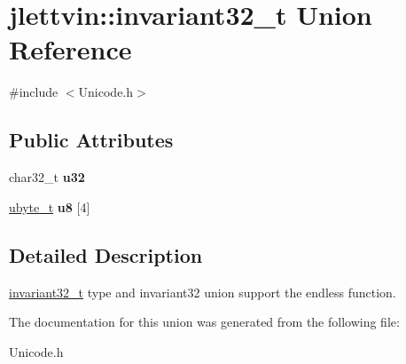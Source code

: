 \hypertarget{unionjlettvin_1_1invariant32__t}{}\section{jlettvin\+:\+:invariant32\+\_\+t Union Reference}
\label{unionjlettvin_1_1invariant32__t}


{\ttfamily \#include $<$Unicode.\+h$>$}

\subsection*{Public Attributes}
\begin{DoxyCompactItemize}
\item 
\hypertarget{unionjlettvin_1_1invariant32__t_a6b960207500139b0240058e81b9cb187}{}char32\+\_\+t {\bfseries u32}\label{unionjlettvin_1_1invariant32__t_a6b960207500139b0240058e81b9cb187}

\item 
\hypertarget{unionjlettvin_1_1invariant32__t_a322c53bdb0d61ba37b80d1a0b8f6040e}{}\hyperlink{namespacejlettvin_a7c7cf84f4fd67858c46a1077ed2e3ad4}{ubyte\+\_\+t} {\bfseries u8} \mbox{[}4\mbox{]}\label{unionjlettvin_1_1invariant32__t_a322c53bdb0d61ba37b80d1a0b8f6040e}

\end{DoxyCompactItemize}


\subsection{Detailed Description}
\hyperlink{unionjlettvin_1_1invariant32__t}{invariant32\+\_\+t} type and invariant32 union support the endless function. 

The documentation for this union was generated from the following file\+:\begin{DoxyCompactItemize}
\item 
Unicode.\+h\end{DoxyCompactItemize}

